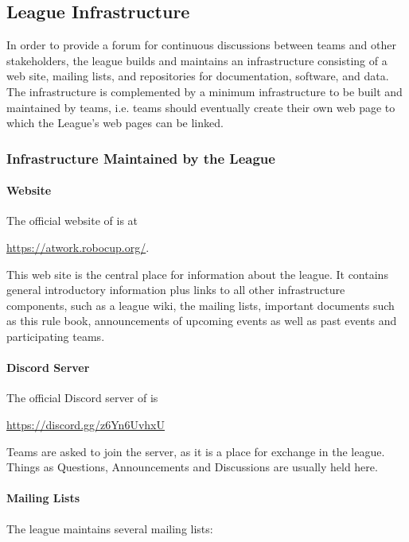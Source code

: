 \subsection{League Infrastructure}
In order to provide a forum for continuous discussions between teams and other stakeholders, the league builds and maintains an infrastructure consisting of a web site, mailing lists, and repositories for documentation, software, and data. The infrastructure is complemented by a minimum infrastructure to be built and maintained by teams, i.e. teams should eventually create their own web page to which the \RCAW League's web pages can be linked.


\subsubsection{Infrastructure Maintained by the League} \label{ssec:LeagueInfrastructure}

\paragraph{Website}
The official website of \RCAW is at
\begin{center}
\url{https://atwork.robocup.org/}.
\end{center}

This web site is the central place for information about the league. It contains general introductory information plus links to all other infrastructure components, such as a league wiki, the mailing lists, important documents such as this rule book, announcements of upcoming events as well as past events and participating teams.


\paragraph{Discord Server}
The official Discord server of \RCAW is
\begin{center}
	\href{Official Discord Server}{https://discord.gg/z6Yn6UvhxU}
\end{center}

Teams are asked to join the server, as it is a place for exchange in the league. 
Things as Questions, Announcements and Discussions are usually held here.

\paragraph{Mailing Lists}
The league maintains several mailing lists:

